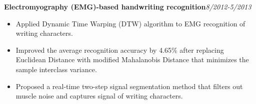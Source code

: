 \documentclass[margin, 9pt]{res} %
\begin{document}
\begin{resume}
\medskip
{\textbf{Electromyography (EMG)-based handwriting recognition}}\hfill\textit{8/2012-5/2013}\\
\vspace*{-10pt}
\begin{itemize}[leftmargin=*] \itemsep -3pt
\vspace*{-5pt}
	\item Applied Dynamic Time Warping (DTW) algorithm to EMG recognition of writing characters.
	\item Improved the average recognition accuracy by 4.65\% after replacing Euclidean Distance with modified Mahalanobis Distance that minimizes the sample interclass variance.
	\item Proposed a real-time two-step signal segmentation method that filters out muscle noise and captures signal of writing characters.
\end{itemize}

\end{resume}
\end{document}
